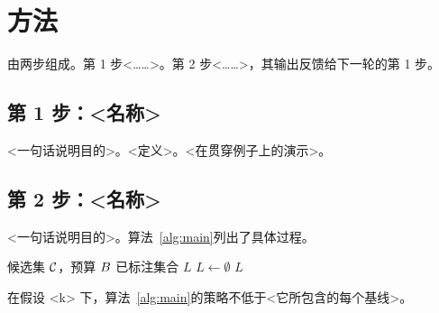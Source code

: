 \section{\sys{} 方法}
\label{sec:method}
\sys{} 由两步组成。第 1 步<……>。第 2 步<……>，其输出反馈给下一轮的第 1 步。

\subsection{第 1 步：<名称>}
\label{sec:step1}
<一句话说明目的>。<定义>。<在贯穿例子上的演示>。

\subsection{第 2 步：<名称>}
\label{sec:step2}
<一句话说明目的>。算法~\ref{alg:main}列出了具体过程。

\begin{algorithm}[t]
\caption{<过程名称>}
\label{alg:main}
\begin{algorithmic}[1]
\REQUIRE 候选集 $\mathcal{C}$，预算 $B$
\ENSURE 已标注集合 $L$
\STATE $L \gets \emptyset$
\ENDWHILE
\RETURN $L$
\end{algorithmic}
\end{algorithm}

\begin{theorem}[保证]
\label{thm:guarantee}
在假设 <k> 下，算法~\ref{alg:main}的策略不低于<它所包含的每个基线>。
\end{theorem}
